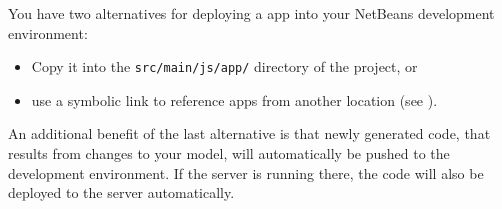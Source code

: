 \subsubsection{\mapapps} 
\label{subsubsec:mapapps}

You have two alternatives for deploying a \mapapps app into your NetBeans development environment:
\begin{itemize}
\item Copy it into the \lstinline[language=Simple]|src/main/js/app/| directory of the project, or
\item use a symbolic link to reference apps from another location (see ).
\end{itemize} 

An additional benefit of the last alternative is that newly generated code, that results from changes to your model, will automatically be pushed to the \mapapps development environment. If the server is running there, the code will also be deployed to the server automatically.
